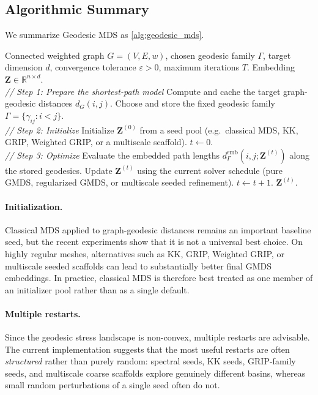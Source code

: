 \documentclass[twoside,11pt]{article}
\newcommand{\R}{\mathbb{R}}
\newcommand{\bZ}{\mathbf{Z}}
\newcommand{\abs}[1]{\left|#1\right|}
\newcommand{\demb}{d^{\mathrm{emb}}}
\begin{document}
\subsection{Algorithmic Summary}

We summarize Geodesic MDS as \cref{alg:geodesic_mds}.

\begin{algorithm}
\caption{Geodesic MDS}
\label{alg:geodesic_mds}
\begin{algorithmic}[1]
  \REQUIRE Connected weighted graph $G=(V,E,w)$, chosen geodesic family
           $\Gamma$, target dimension $d$, convergence tolerance
           $\varepsilon>0$, maximum iterations $T$.
  \ENSURE Embedding $\bZ \in \R^{n \times d}$.
  \\
  \textit{// Step 1: Prepare the shortest-path model}
  \STATE Compute and cache the target graph-geodesic distances $d_G(i,j)$.
  \STATE Choose and store the fixed geodesic family
         $\Gamma = \{\gamma_{ij}: i<j\}$.
  \\
  \textit{// Step 2: Initialize}
  \STATE Initialize $\bZ^{(0)}$ from a seed pool
         (e.g.\ classical MDS, KK, GRIP, Weighted GRIP, or a multiscale scaffold).
  \STATE $t \leftarrow 0$.
  \\
  \textit{// Step 3: Optimize}
  \REPEAT
    \STATE Evaluate the embedded path lengths
           $\demb_{\Gamma}(i,j;\bZ^{(t)})$ along the stored geodesics.
    \STATE Update $\bZ^{(t)}$ using the current solver schedule
           (pure GMDS, regularized GMDS, or multiscale seeded refinement).
    \STATE $t \leftarrow t + 1$.
  \UNTIL{$\abs{\sigma^{\mathrm{geo}}(\bZ^{(t)}) - \sigma^{\mathrm{geo}}(\bZ^{(t-1)})} < \varepsilon$
         or $t \geq T$.}
  \RETURN $\bZ^{(t)}$.
\end{algorithmic}
\end{algorithm}

\paragraph{Initialization.}
Classical MDS applied to graph-geodesic distances remains an important baseline
seed, but the recent experiments show that it is not a universal best choice.
On highly regular meshes, alternatives such as KK, GRIP, Weighted GRIP, or
multiscale seeded scaffolds can lead to substantially better final GMDS
embeddings.  In practice, classical MDS is therefore best treated as one member
of an initializer pool rather than as a single default.

\paragraph{Multiple restarts.}
Since the geodesic stress landscape is non-convex, multiple restarts are
advisable.  The current implementation suggests that the most useful restarts
are often \emph{structured} rather than purely random: spectral seeds, KK
seeds, GRIP-family seeds, and multiscale coarse scaffolds explore genuinely
different basins, whereas small random perturbations of a single seed often do
not.
\end{document}
